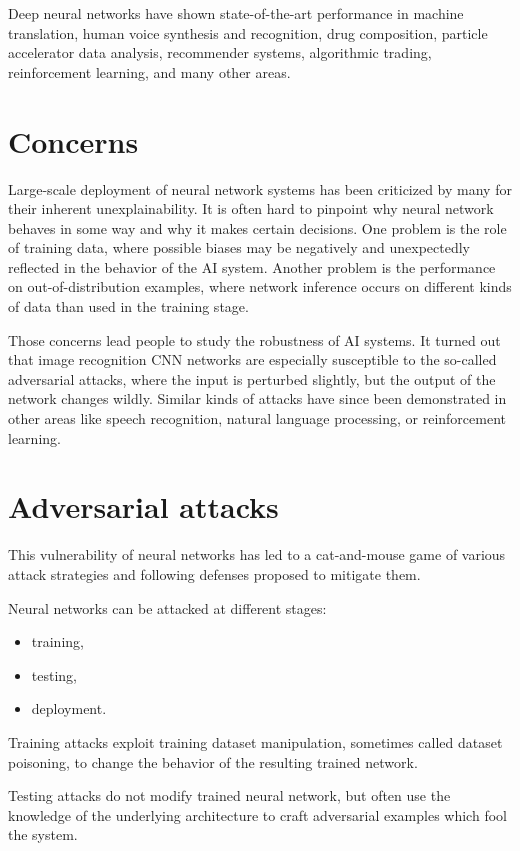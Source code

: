 Deep neural networks have shown state-of-the-art performance in machine translation, human voice synthesis and recognition, drug composition, particle accelerator data analysis, recommender systems, algorithmic trading, reinforcement learning, and many other areas.

\section{Concerns}
Large-scale deployment of neural network systems has been criticized by many for their inherent unexplainability. It is often hard to pinpoint why neural network behaves in some way and why it makes certain decisions. One problem is the role of training data, where possible biases may be negatively and unexpectedly reflected in the behavior of the AI system. Another problem is the performance on out-of-distribution examples, where network inference occurs on different kinds of data than used in the training stage.

Those concerns lead people to study the robustness of AI systems. It turned out that image recognition CNN networks are especially susceptible to the so-called adversarial attacks, where the input is perturbed slightly, but the output of the network changes wildly. Similar kinds of attacks have since been demonstrated in other areas like speech recognition, natural language processing, or reinforcement learning.

\section{Adversarial attacks}
This vulnerability of neural networks has led to a cat-and-mouse game of various attack strategies and following defenses proposed to mitigate them.

Neural networks can be attacked at different stages:
\begin{itemize}
    \item training,
    \item testing,
    \item deployment.
\end{itemize}

Training attacks exploit training dataset manipulation, sometimes called dataset poisoning, to change the behavior of the resulting trained network.

Testing attacks do not modify trained neural network, but often use the knowledge of the underlying architecture to craft adversarial examples which fool the system. 

